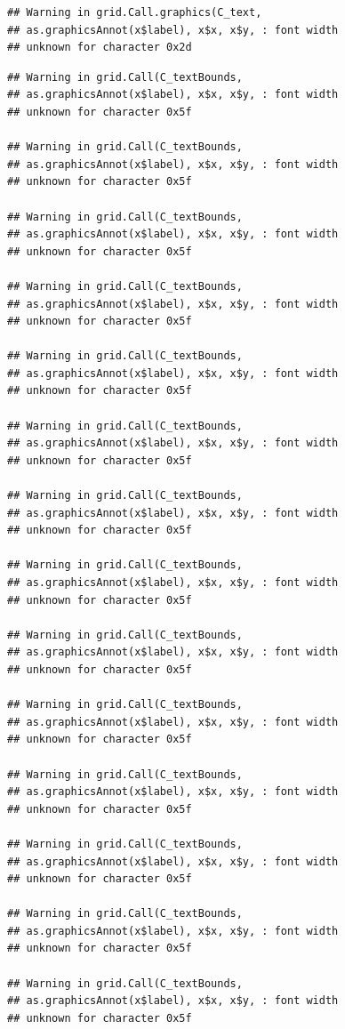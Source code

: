 \documentclass[
]{book}
\begin{document}
\begin{verbatim}
## Warning in grid.Call.graphics(C_text,
## as.graphicsAnnot(x$label), x$x, x$y, : font width
## unknown for character 0x2d
\end{verbatim}

\begin{verbatim}
## Warning in grid.Call(C_textBounds,
## as.graphicsAnnot(x$label), x$x, x$y, : font width
## unknown for character 0x5f

## Warning in grid.Call(C_textBounds,
## as.graphicsAnnot(x$label), x$x, x$y, : font width
## unknown for character 0x5f

## Warning in grid.Call(C_textBounds,
## as.graphicsAnnot(x$label), x$x, x$y, : font width
## unknown for character 0x5f

## Warning in grid.Call(C_textBounds,
## as.graphicsAnnot(x$label), x$x, x$y, : font width
## unknown for character 0x5f

## Warning in grid.Call(C_textBounds,
## as.graphicsAnnot(x$label), x$x, x$y, : font width
## unknown for character 0x5f

## Warning in grid.Call(C_textBounds,
## as.graphicsAnnot(x$label), x$x, x$y, : font width
## unknown for character 0x5f

## Warning in grid.Call(C_textBounds,
## as.graphicsAnnot(x$label), x$x, x$y, : font width
## unknown for character 0x5f

## Warning in grid.Call(C_textBounds,
## as.graphicsAnnot(x$label), x$x, x$y, : font width
## unknown for character 0x5f

## Warning in grid.Call(C_textBounds,
## as.graphicsAnnot(x$label), x$x, x$y, : font width
## unknown for character 0x5f

## Warning in grid.Call(C_textBounds,
## as.graphicsAnnot(x$label), x$x, x$y, : font width
## unknown for character 0x5f

## Warning in grid.Call(C_textBounds,
## as.graphicsAnnot(x$label), x$x, x$y, : font width
## unknown for character 0x5f

## Warning in grid.Call(C_textBounds,
## as.graphicsAnnot(x$label), x$x, x$y, : font width
## unknown for character 0x5f

## Warning in grid.Call(C_textBounds,
## as.graphicsAnnot(x$label), x$x, x$y, : font width
## unknown for character 0x5f

## Warning in grid.Call(C_textBounds,
## as.graphicsAnnot(x$label), x$x, x$y, : font width
## unknown for character 0x5f
\end{verbatim}
\end{document}
